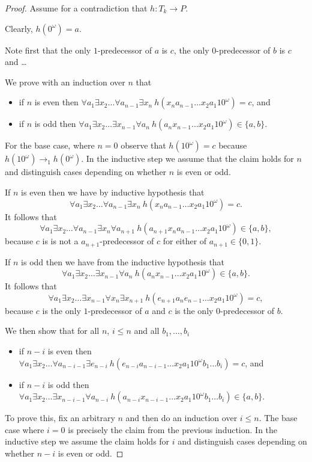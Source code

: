 \documentclass[a4paper]{article}
\begin{document}
\begin{proof}
 Assume for a contradiction that $h : T_k \to P$.

Clearly, $h(0^\omega) = a$.

Note first that the only $1$-predecessor of $a$ is $c$, the only
$0$-predecessor of $b$ is $c$ and \dots

\medskip

We prove with an induction over $n$ that
\begin{itemize}
 \item if $n$ is even then $\forall a_1 \exists x_2 \dots
\forall a_{n - 1} \exists x_n \  h(x_n a_{n - 1} \dots x_2 a_1 1 0^\omega) = c$,
and
 \item if $n$ is odd then $\forall a_1 \exists x_2
\dots \exists x_{n - 1} \forall a_n \  h(a_n x_{n - 1}\dots
x_2 a_1 1 0^\omega) \in \{a, b\}$.
\end{itemize}
For the base case, where $n = 0$ observe that $h(10^\omega) = c$ because
$h(10^\omega) \rightarrow_1 h(0^\omega)$. In the inductive step we
assume that the claim holds for $n$ and distinguish cases depending on
whether $n$ is even or odd.

If $n$ is even then we have by inductive hypothesis that
\[
 \forall a_1 \exists x_2 \dots \forall a_{n - 1} \exists x_n \  h(x_n
a_{n - 1} \dots x_2 a_1 1 0^\omega) = c.
\]
It follows that
\[
 \forall a_1 \exists x_2 \dots \forall a_{n - 1} \exists x_n \forall
a_{n + 1} \ h(a_{n + 1} x_n
a_{n - 1} \dots x_2 a_1 1 0^\omega) \in \{a,b\},
\]
because $c$ is is not a $a_{n + 1}$-predecessor of $c$ for either of
$a_{n + 1} \in \{0,1\}$.

If $n$ is odd then we have from the inductive hypothesis that
\[
\forall a_1 \exists x_2
\dots \exists x_{n - 1} \forall a_n \  h(a_n x_{n - 1}\dots
x_2 a_1 1 0^\omega) \in \{a, b\}.
\]
It follows that
\[
 \forall a_1 \exists x_2 \dots \exists x_{n - 1} \forall x_n \exists
x_{n + 1} \ h(e_{n + 1} a_n
e_{n - 1} \dots x_2 a_1 1 0^\omega) = c,
\]
because $c$ is the only $1$-predecessor of $a$ and $c$ is the only
$0$-predecessor of $b$.

\medskip

We then show that for all $n$, $i \leq n$ and all $b_1,\dots,b_i$
\begin{itemize}
 \item if $n - i$ is even then $\forall a_1 \exists x_2 \dots \forall
a_{n - i - 1} \exists e_{n - i} \  h(e_{n - i} a_{n - i - 1} \dots x_2
a_1 1 0^\omega b_1 \dots b_i) = c$, and
 \item if $n - i$ is odd then $\forall a_1 \exists x_2
\dots \exists x_{n - i - 1} \forall a_{n - i} \
h(a_{n - i} x_{n - i - 1} \dots
x_2 a_1 1 0^\omega b_1 \dots b_i) \in \{a,b\}$.
\end{itemize}
To prove this, fix an arbitrary $n$ and then do an induction over $i
\leq n$. The base case where $i = 0$ is precisely the claim from the
previous induction. In the inductive step we assume the claim holds for
$i$ and distinguish cases depending on whether $n - i$ is even or odd.


\end{proof}
\end{document}
